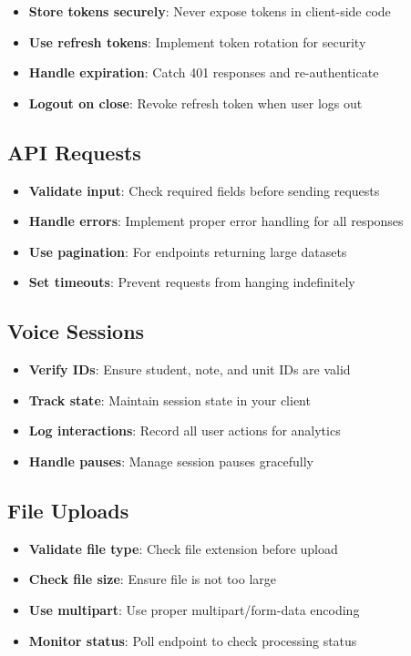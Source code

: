 \documentclass[12pt,a4paper,oneside]{article}
\begin{document}
\begin{itemize}
    \item \textbf{Store tokens securely}: Never expose tokens in client-side code
    \item \textbf{Use refresh tokens}: Implement token rotation for security
    \item \textbf{Handle expiration}: Catch 401 responses and re-authenticate
    \item \textbf{Logout on close}: Revoke refresh token when user logs out
\end{itemize}

\subsection{API Requests}

\begin{itemize}
    \item \textbf{Validate input}: Check required fields before sending requests
    \item \textbf{Handle errors}: Implement proper error handling for all responses
    \item \textbf{Use pagination}: For endpoints returning large datasets
    \item \textbf{Set timeouts}: Prevent requests from hanging indefinitely
\end{itemize}

\subsection{Voice Sessions}

\begin{itemize}
    \item \textbf{Verify IDs}: Ensure student, note, and unit IDs are valid
    \item \textbf{Track state}: Maintain session state in your client
    \item \textbf{Log interactions}: Record all user actions for analytics
    \item \textbf{Handle pauses}: Manage session pauses gracefully
\end{itemize}

\subsection{File Uploads}

\begin{itemize}
    \item \textbf{Validate file type}: Check file extension before upload
    \item \textbf{Check file size}: Ensure file is not too large
    \item \textbf{Use multipart}: Use proper multipart/form-data encoding
    \item \textbf{Monitor status}: Poll endpoint to check processing status
\end{itemize}
\end{document}
